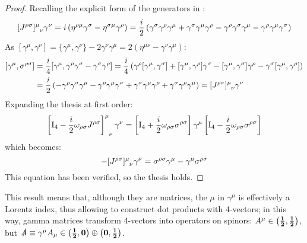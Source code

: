 \begin{proofbox}
  \begin{proof}
    Recalling the explicit form of the generators in :
    \begin{equation*}
      \tensor{[J^{\rho \sigma}]}{^\mu_\nu} \gamma^\nu = i \left( \eta^{\rho \mu} \gamma^\sigma - \eta^{\sigma \mu} \gamma^\rho \right) = \frac{i}{2} \left( \gamma^\sigma \gamma^\rho \gamma^\mu + \gamma^\sigma \gamma^\mu \gamma^\rho - \gamma^\rho \gamma^\sigma \gamma^\mu - \gamma^\rho \gamma^\mu \gamma^\sigma \right)
    \end{equation*}
    As $ [\gamma^\mu , \gamma^\nu] = \{\gamma^\mu , \gamma^\nu\} - 2 \gamma^\nu \gamma^\mu = 2 \left( \eta^{\mu \nu} - \gamma^\nu \gamma^\mu \right) $:
    \begin{equation*}
      \begin{split}
        [\gamma^\mu , \sigma^{\rho \sigma}]
        &= \frac{i}{4} [\gamma^\mu , \gamma^\rho \gamma^\sigma - \gamma^\sigma \gamma^\rho] = \frac{i}{4} \left( \gamma^\rho [\gamma^\mu , \gamma^\sigma] + [\gamma^\mu , \gamma^\rho] \gamma^\sigma - [\gamma^\mu , \gamma^\sigma] \gamma^\rho - \gamma^\sigma [\gamma^\mu , \gamma^\rho] \right) \\
        &= \frac{i}{2} \left( - \gamma^\rho \gamma^\sigma \gamma^\mu - \gamma^\rho \gamma^\mu \gamma^\sigma + \gamma^\sigma \gamma^\mu \gamma^\rho + \gamma^\sigma \gamma^\rho \gamma^\mu \right) = \tensor{[J^{\rho \sigma}]}{^\mu_\nu} \gamma^\nu
      \end{split}
    \end{equation*}
    Expanding the thesis at first order:
    \begin{equation*}
      \tensor{\left[ \tens{I}_4 - \frac{i}{2} \omega_{\rho \sigma} J^{\rho \sigma} \right]}{^\mu_\nu} \gamma^\nu = \left[ \tens{I}_4 + \frac{i}{2} \omega_{\rho \sigma} \sigma^{\rho \sigma} \right] \gamma^\mu \left[ \tens{I}_4 - \frac{i}{2} \omega_{\rho \sigma} \sigma^{\rho \sigma} \right]
    \end{equation*}
    which becomes:
    \begin{equation*}
      - \tensor{[J^{\rho \sigma}]}{^\mu_\nu} \gamma^\nu = \sigma^{\rho \sigma} \gamma^\mu - \gamma^\mu \sigma^{\rho \sigma}
    \end{equation*}
    This equation has been verified, so the thesis holds.
  \end{proof}
\end{proofbox}

This result means that, although they are matrices, the $ \mu $ in $ \gamma^\mu $ is effectively a Lorentz index, thus allowing to construct dot products with 4-vectors; in this way, gamma matrices transform 4-vectors into operators on spinors\footnotemark: $ A^\mu \in \mathbf{\left( \frac{1}{2},\frac{1}{2} \right)} $, but $ \slashed{A} \equiv \gamma^\mu A_\mu \in \mathbf{\left( \frac{1}{2},0 \right)} \oplus \mathbf{\left( 0,\frac{1}{2} \right)} $.

